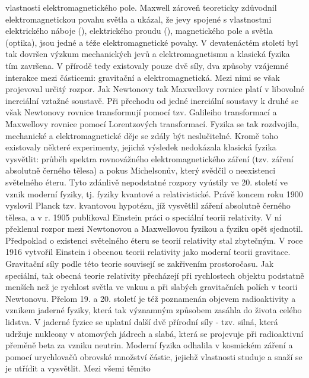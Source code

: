     vlastnosti elektromagnetického pole. Maxwell zároveň teoreticky zdůvodnil elektromagnetickou
    povahu světla a ukázal, že jevy spojené s vlastnostmi elektrického náboje (),
    elektrického proudu (), magnetického pole a světla (optika), jsou jedné a téže
    elektromagnetické povahy. V devatenáctém století byl tak dovršen výzkum mechanických jevů a
    elektromagnetismu a klasická fyzika tím završena. V přírodě tedy existovaly pouze dvě síly, dva
    způsoby vzájemné interakce mezi částicemi: gravitační a elektromagnetická. Mezi nimi se však
    projevoval určitý rozpor. Jak Newtonovy tak Maxwellovy rovnice platí v libovolné inerciální
    vztažné soustavě. Při přechodu od jedné inerciální soustavy k druhé se však Newtonovy rovnice
    transformují pomocí tzv. Galileiho transformací a Maxwellovy rovnice pomocí Lorentzových
    transformací. Fyzika se tak rozdvojila, mechanické a elektromagnetické děje se zdály být
    neslučitelné. Kromě toho existovaly některé experimenty, jejichž výsledek nedokázala klasická
    fyzika vysvětlit: průběh spektra rovnovážného elektromagnetického záření (tzv. záření absolutně
    černého tělesa) a pokus Michelsonův, který svědčil o neexistenci světelného éteru. Tyto zdánlivě
    nepodstatné rozpory vyústily ve 20. století ve vznik moderní fyziky, tj. fyziky kvantové a
    relativistické. Právě koncem roku 1900 vyslovil Planck tzv. kvantovou hypotézu, jíž vysvětlil
    záření absolutně černého tělesa, a v r. 1905 publikoval Einstein práci o speciální teorii
    relativity. V ní překlenul rozpor mezi Newtonovou a Maxwellovou fyzikou a fyziku opět sjednotil.
    Předpoklad o existenci světelného éteru se teorií relativity stal zbytečným. V roce 1916
    vytvořil Einstein i obecnou teorii relativity jako moderní teorii gravitace. Gravitační síly
    podle této teorie souvisejí se zakřivením prostoročasu. Jak speciální, tak obecná teorie
    relativity přecházejí při rychlostech objektu podstatně menších než je rychlost světla ve vakuu
    a při slabých gravitačních polích v teorii Newtonovu. Přelom 19. a 20. století je též poznamenán
    objevem radioaktivity a vznikem jaderné fyziky, která tak významným způsobem zasáhla do života
    celého lidstva. V jaderné fyzice se uplatní další dvě přírodní síly - tzv. silná, která udržuje
    nukleony v atomových jádrech a slabá, která se projevuje při radioaktivní přeměně beta za vzniku
    neutrin. Moderní fyzika odhalila v kosmickém záření a pomocí urychlovačů obrovské množství
    částic, jejichž vlastnosti studuje a snaží se je utřídit a vysvětlit. Mezi všemi těmito
